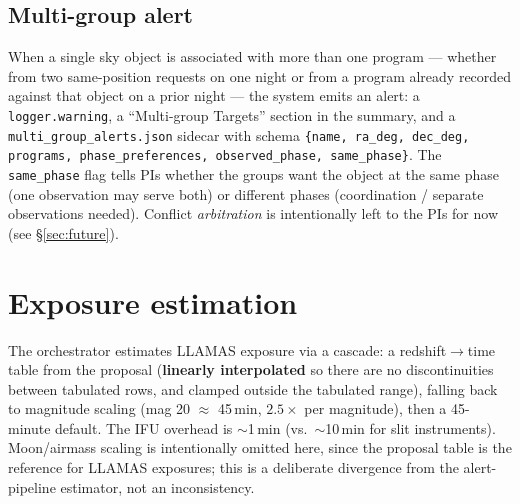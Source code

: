 \documentclass[11pt,letterpaper]{article}
\begin{document}
\subsection{Multi-group alert}
When a single sky object is associated with more than one program --- whether from two
same-position requests on one night or from a program already recorded against that object on
a prior night --- the system emits an alert: a \texttt{logger.warning}, a
``Multi-group Targets'' section in the summary, and a \texttt{multi\_group\_alerts.json}
sidecar with schema \texttt{\{name, ra\_deg, dec\_deg, programs, phase\_preferences,
observed\_phase, same\_phase\}}. The \texttt{same\_phase} flag tells PIs whether the
groups want the object at the same phase (one observation may serve both) or different phases
(coordination / separate observations needed). Conflict \emph{arbitration} is intentionally
left to the PIs for now (see \S\ref{sec:future}).

\section{Exposure estimation}
The orchestrator estimates LLAMAS exposure via a cascade: a redshift$\rightarrow$time table
from the proposal (\textbf{linearly interpolated} so there are no discontinuities between
tabulated rows, and clamped outside the tabulated range), falling back to magnitude scaling
(mag 20 $\approx$ 45\,min, $2.5\times$ per magnitude), then a 45-minute default. The IFU
overhead is $\sim$1\,min (vs.\ $\sim$10\,min for slit instruments). Moon/airmass scaling is
intentionally omitted here, since the proposal table is the reference for LLAMAS exposures;
this is a deliberate divergence from the alert-pipeline estimator, not an inconsistency.
\end{document}
